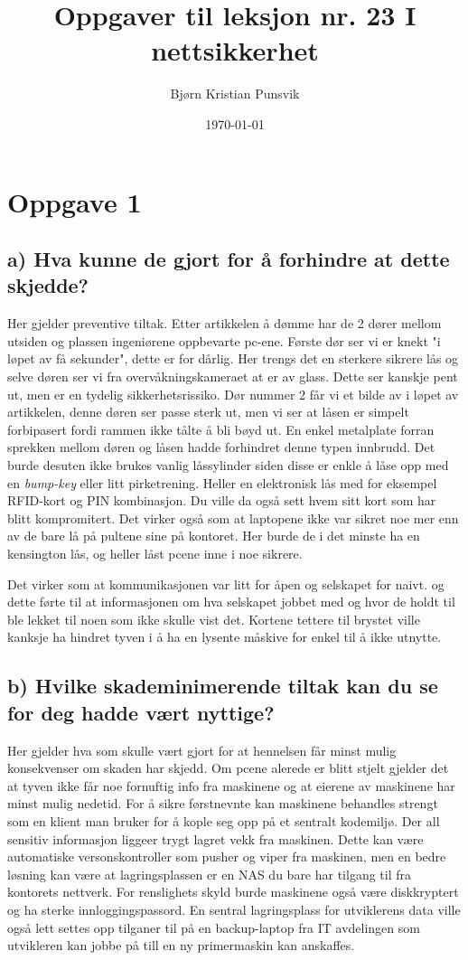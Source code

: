 \documentclass[12pt,a4paper,norsk]{article}
\title{\vspace{-3cm}Oppgaver til leksjon nr. 23 I nettsikkerhet}
\author{Bjørn Kristian Punsvik}
\date{\today}
\begin{document}
\maketitle
\section*{Oppgave 1}
\subsection*{a) Hva kunne de gjort for å forhindre at dette skjedde?}
Her gjelder preventive tiltak. Etter artikkelen å dømme har de 2 dører mellom utsiden og plassen ingeniørene oppbevarte pc-ene. Første dør ser vi er knekt "i løpet av få sekunder", dette er for dårlig. Her trengs det en sterkere sikrere lås og selve døren ser vi fra overvåkningskameraet at er av glass. Dette ser kanskje pent ut, men er en tydelig sikkerhetsrissiko. Dør nummer 2 får vi et bilde av i løpet av artikkelen, denne døren ser passe sterk ut, men vi ser at låsen er simpelt forbipasert fordi rammen ikke tålte å bli bøyd ut. En enkel metalplate forran sprekken mellom døren og låsen hadde forhindret denne typen innbrudd. Det burde desuten ikke brukes vanlig låssylinder siden disse er enkle å låse opp med en \textit{bump-key} eller litt pirketrening. Heller en elektronisk lås med for eksempel RFID-kort og PIN kombinasjon. Du ville da også sett hvem sitt kort som har blitt kompromitert. Det virker også som at laptopene ikke var sikret noe mer enn av de bare lå på pultene sine på kontoret. Her burde de i det minste ha en kensington lås, og heller låst pcene inne i noe sikrere.

Det virker som at kommunikasjonen var litt for åpen og selskapet for naivt. og dette førte til at informasjonen om hva selskapet jobbet med og hvor de holdt til ble lekket til noen som ikke skulle vist det. Kortene tettere til brystet ville kanksje ha hindret tyven i å ha en lysente måskive for enkel til å ikke utnytte.


\subsection*{b) Hvilke skademinimerende tiltak kan du se for deg hadde vært nyttige?}
Her gjelder hva som skulle vært gjort for at hennelsen får minst mulig konsekvenser om skaden har skjedd. Om pcene alerede er blitt stjelt gjelder det at tyven ikke får noe fornuftig info fra maskinene og at eierene av maskinene har minst mulig nedetid. For å sikre førstnevnte kan maskinene behandles strengt som en klient man bruker for å kople seg opp på et sentralt kodemiljø. Der all sensitiv informasjon liggeer trygt lagret vekk fra maskinen. Dette kan være automatiske versonskontroller som pusher og viper fra maskinen, men en bedre løsning kan være at lagringsplassen er en NAS du bare har tilgang til fra kontorets nettverk. For renslighets skyld burde maskinene også være diskkryptert og ha sterke innloggingspassord. En sentral lagringsplass for utviklerens data ville også lett settes opp tilganer til på en backup-laptop fra IT avdelingen som utvikleren kan jobbe på till en ny primermaskin kan anskaffes.
\end{document}
